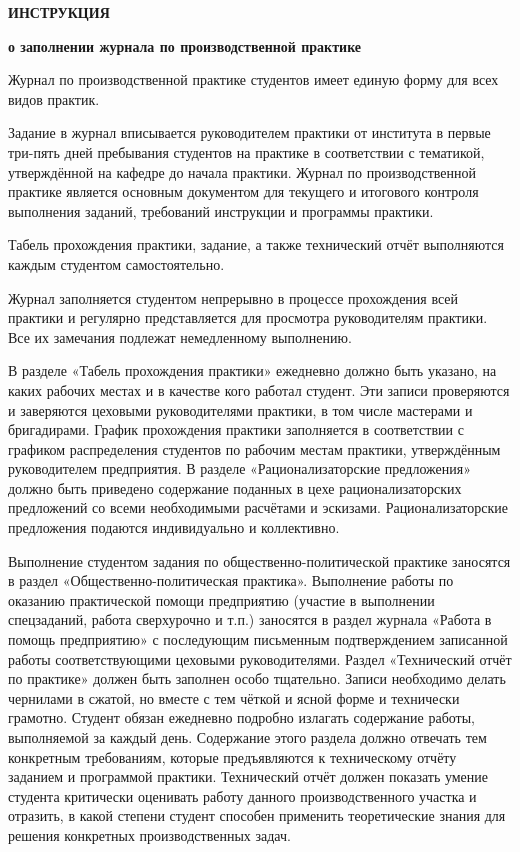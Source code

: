 \documentclass[dvipsnames,pdf, unicode, 12pt, a4paper, oneside, fleqn]{article}
\begin{document}
	\begin{center}
		\bfseries{\large ИНСТРУКЦИЯ }
		
		\vspace{12pt}
		
		\bfseries{о заполнении журнала по производственной практике}
	\end{center}
	
	\begin{multicols}{2}
		{\small
			Журнал по производственной практике студентов имеет единую форму для всех видов практик.
			
			Задание в журнал вписывается руководителем практики от института в первые три-пять дней пребывания студентов на практике в соответствии с тематикой, утверждённой на кафедре до начала практики. Журнал по производственной практике является основным документом для текущего и итогового контроля выполнения заданий, требований инструкции и программы практики.
			
			Табель прохождения практики, задание, а также технический отчёт выполняются каждым студентом самостоятельно.
			
			Журнал заполняется студентом непрерывно в процессе прохождения всей практики и регулярно представляется для просмотра руководителям практики. Все их замечания подлежат немедленному выполнению.
			
			В разделе «Табель прохождения практики» ежедневно должно быть указано, на каких рабочих местах и в качестве кого работал студент. Эти записи проверяются и заверяются цеховыми руководителями практики, в том числе мастерами и бригадирами. График прохождения практики заполняется в соответствии с графиком распределения студентов по рабочим местам практики, утверждённым руководителем предприятия.
			В разделе «Рационализаторские предложения» должно быть приведено содержание поданных в цехе рационализаторских предложений со всеми необходимыми расчётами и эскизами. Рационализаторские предложения подаются индивидуально и коллективно.
			
			Выполнение студентом задания по общественно-политической практике заносятся в раздел «Общественно-политическая практика». Выполнение работы по оказанию практической помощи предприятию (участие в выполнении спецзаданий, работа сверхурочно и т.п.) заносятся в раздел журнала «Работа в помощь предприятию» с последующим письменным подтверждением записанной работы соответствующими цеховыми руководителями.
			Раздел «Технический отчёт по практике» должен быть заполнен особо тщательно. Записи необходимо делать чернилами в сжатой, но вместе с тем чёткой и ясной форме и технически грамотно. Студент обязан ежедневно подробно излагать содержание работы, выполняемой за каждый день. Содержание этого раздела должно отвечать тем конкретным требованиям, которые предъявляются к техническому отчёту заданием и программой практики. Технический отчёт должен показать умение студента критически оценивать работу данного производственного участка и отразить, в какой степени студент способен применить теоретические знания для решения конкретных производственных задач.
			
}
\end{multicols}
\end{document}
